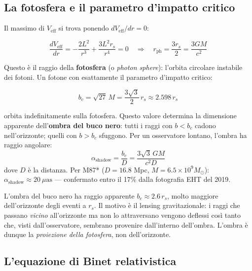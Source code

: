 \documentclass[12pt, a4paper, twoside]{article}
\newenvironment{physbox}[1]{%
  \begin{tcolorbox}[equationbox, title={#1}]
}{%
  \end{tcolorbox}
}
\newenvironment{curiosity}[1]{%
  \begin{tcolorbox}[curiositybox, title={Curiosit\`a: #1}]
}{%
  \end{tcolorbox}
}
\theoremstyle{definition}
\newcommand{\RS}{r_{\!s}}          %
\newcommand{\bc}{b_{\!c}}          %
\begin{document}
\subsection{La fotosfera e il parametro d'impatto critico}

Il massimo di $V_{\text{eff}}$ si trova ponendo $dV_{\text{eff}}/dr = 0$:

\begin{equation}
  \frac{dV_{\text{eff}}}{dr} = -\frac{2L^2}{r^3} + \frac{3L^2\RS}{r^4} = 0
  \quad\Longrightarrow\quad
  r_{\text{ph}} = \frac{3\RS}{2} = \frac{3GM}{c^2}
\end{equation}

Questo è il raggio della \textbf{fotosfera} (o \emph{photon sphere}): l'orbita
circolare instabile dei fotoni. Un fotone con esattamente il parametro
d'impatto critico:

\begin{physbox}{Parametro d'impatto critico}
\begin{equation}
  \bc = \sqrt{27}\, M = \frac{3\sqrt{3}}{2}\, \RS \approx 2.598\,\RS
  \label{eq:bcrit}
\end{equation}
\end{physbox}

orbita indefinitamente sulla fotosfera. Questo valore determina la dimensione
apparente dell'\textbf{ombra del buco nero}: tutti i raggi con $b < \bc$ cadono
nell'orizzonte; quelli con $b > \bc$ sfuggono. Per un osservatore lontano,
l'ombra ha raggio angolare:
\begin{equation}
  \alpha_{\text{shadow}} = \frac{\bc}{D} = \frac{3\sqrt{3}\,GM}{c^2 D}
\end{equation}
dove $D$ è la distanza. Per M87* ($D = 16.8$ Mpc, $M = 6.5 \times 10^9 M_\odot$):
$\alpha_{\text{shadow}} \approx 20\ \mu\text{as}$ — confermato entro il 17\%
dalla fotografia EHT del 2019.

\begin{curiosity}{Perché l'ombra è più grande dell'orizzonte?}
  L'ombra del buco nero ha raggio apparente $\bc \approx 2.6\,\RS$, molto
  maggiore dell'orizzonte degli eventi a $\RS$. Il motivo è il lensing
  gravitazionale: i raggi che passano \emph{vicino} all'orizzonte ma non
  lo attraversano vengono deflessi così tanto che, visti dall'osservatore,
  sembrano provenire dall'interno dell'ombra. L'ombra è dunque la \emph{proiezione
  della fotosfera}, non dell'orizzonte.
\end{curiosity}

\subsection{L'equazione di Binet relativistica}
\end{document}
